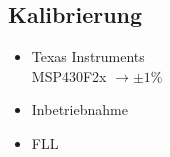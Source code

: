 \subsection{Kalibrierung}
\begin{frame}
  \begin{itemize}
    \item Texas Instruments \pause \\
      MSP430F2x $\rightarrow \pm 1 \%$ \pause \\
    \item Inbetriebnahme \pause
    \item FLL
  \end{itemize}
\end{frame}